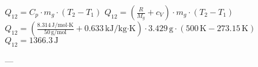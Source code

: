 \( Q_{12} = C_p \cdot m_g \cdot (T_{2} - T_{1}) \)  
\( Q_{12} = \left( \frac{R}{M_g} + c_V \right) \cdot m_g \cdot (T_{2} - T_{1}) \)  
\( Q_{12} = \left( \frac{8.314 \, \text{J/mol·K}}{50 \, \text{g/mol}} + 0.633 \, \text{kJ/kg·K} \right) \cdot 3.429 \, \text{g} \cdot (500 \, \text{K} - 273.15 \, \text{K}) \)  
\( Q_{12} = 1366.3 \, \text{J} \)  

---